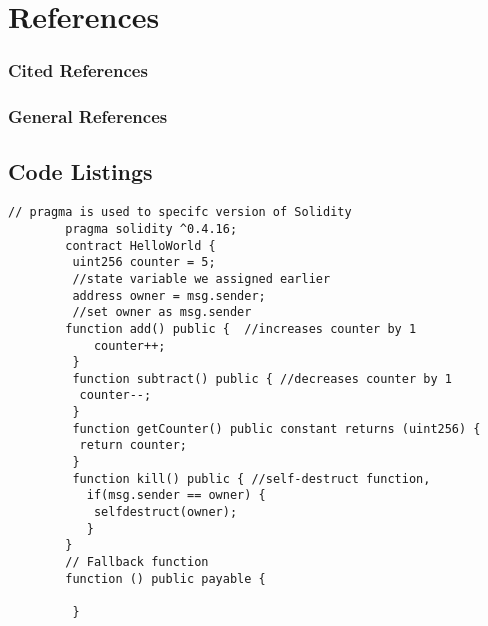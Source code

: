 \documentclass[12pt,tightenlines,letterpaper,listof=totoc]{scrartcl}
\begin{document}

\section{References}
\subsubsection*{Cited References}
\printbibliography[heading=none,category=cited]

\subsubsection*{General References}
\printbibliography[heading=none,notcategory=cited] 
\linespread{1}

\newpage
\begin{appendices}
\section{Code Listings}
	\begin{lstlisting}[language=Solidity,caption=Smart contract in Solidity,label={lst:label}]
		// pragma is used to specifc version of Solidity
		pragma solidity ^0.4.16;
		contract HelloWorld {
		 uint256 counter = 5; 
		 //state variable we assigned earlier
		 address owner = msg.sender; 
		 //set owner as msg.sender
		function add() public {  //increases counter by 1
	  		counter++;
		 }
		 function subtract() public { //decreases counter by 1
		  counter--;
		 }
		 function getCounter() public constant returns (uint256) {
		  return counter;
		 } 
		 function kill() public { //self-destruct function, 
		   if(msg.sender == owner) {
		    selfdestruct(owner); 
		   }
		}
		// Fallback function
		function () public payable {
		
		 }
	\end{lstlisting}


\end{appendices}
\end{document}
